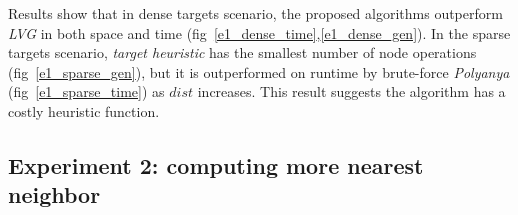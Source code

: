 


Results show that in dense targets scenario, the proposed algorithms outperform \textit{LVG} in both space and time (fig~\ref{e1_dense_time},\ref{e1_dense_gen}). In the sparse targets scenario, \textit{target heuristic} has the smallest number of node operations (fig~\ref{e1_sparse_gen}), but it is outperformed on runtime by brute-force \textit{Polyanya} (fig~\ref{e1_sparse_time}) as $dist$ increases. This result suggests the algorithm has a costly heuristic function.

\subsection{Experiment 2: computing more nearest neighbor}

